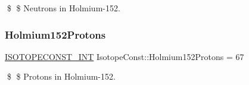 \$ \$ Neutrons in Holmium-\/152. \mbox{\label{group___isotope_const-_holmium-_ho152_ga7dc090ed89f4f6e2fff219f640a5bee9}} 
\subsubsection{\texorpdfstring{Holmium152\+Protons}{Holmium152Protons}}
{\footnotesize\ttfamily \mbox{\hyperlink{group___isotope_const-_macros_ga5f18360b3e99483a35c32d789e62621c}{I\+S\+O\+T\+O\+P\+E\+C\+O\+N\+S\+T\+\_\+\+I\+NT}} Isotope\+Const\+::\+Holmium152\+Protons = 67}

\$ \$ Protons in Holmium-\/152. 